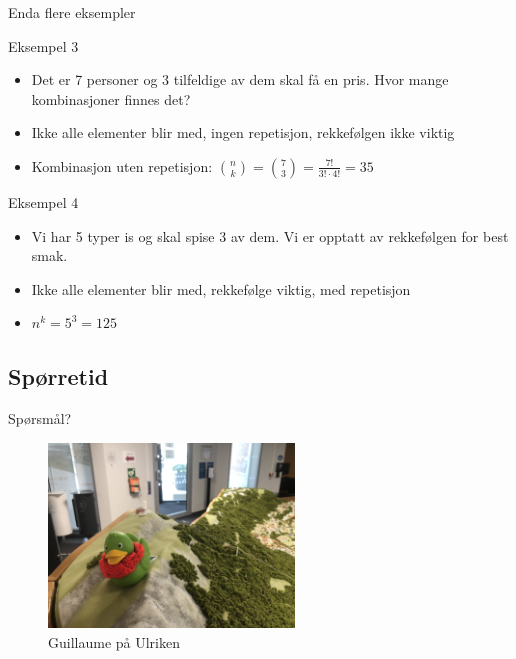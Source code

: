 \begin{frame}{Enda flere eksempler}
\begin{block}{Eksempel 3}
\begin{itemize}
\item Det er 7 personer og 3 tilfeldige av dem skal få en pris. Hvor mange kombinasjoner finnes det?
\item Ikke alle elementer blir med, ingen repetisjon, rekkefølgen ikke viktig 
\item Kombinasjon uten repetisjon: $\binom{n}{k}=\binom{7}{3}=\frac{7!}{3!\cdot 4!}=35$
\end{itemize}
\end{block}
\pause
\begin{block}{Eksempel 4}
\begin{itemize}
\item Vi har 5 typer is og skal spise 3 av dem. Vi er opptatt av rekkefølgen for best smak.
\item Ikke alle elementer blir med, rekkefølge viktig, med repetisjon
\item $n^k=5^3=125$
\end{itemize}
\end{block}
\end{frame}

\subsection*{Spørretid}
\begin{frame}{Spørsmål?}
    \begin{figure}
        \centering
        \includegraphics[height = 4.9cm]{images/guillaume11.jpg}
        \caption{Guillaume på Ulriken}
        \label{fig:guillaume11}
    \end{figure}
\end{frame}

